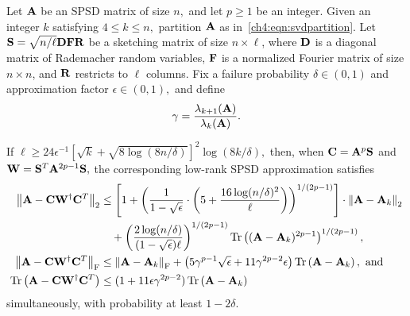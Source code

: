 \begin{thm}
Let $\mathbf{A}$ be an SPSD matrix of size $n,$ and let $p \geq 1$ be an integer. Given an integer $k$
satisfying $4 \leq k \leq n,$ partition $\mathbf{A}$ as in~\eqref{ch4:eqn:svdpartition}. Let 
$\mathbf{S} = \sqrt{n/\ell} \mathbf{D} \mathbf{F} \mathbf{R}$ be a sketching matrix of 
size $n \times \ell$, where $\mathbf{D}$ is a diagonal matrix of Rademacher 
random variables, $\mathbf{F}$ is a normalized Fourier matrix of size 
$n \times n$, and $\mathbf{R}$ restricts to $\ell$ columns. 
Fix a failure probability $\delta \in (0,1)$ and approximation factor $\epsilon \in (0,1),$ and define
\[
 \gamma = \frac{\lambda_{k+1}(\mathbf{A})}{\lambda_k(\mathbf{A})}.
\]


If $\ell \geq 24 \epsilon^{-1} [\sqrt{k} + \sqrt{8 \log( 8 n/\delta)}]^2 \log(8 k/\delta),$ 
then, when $\mathbf{C} = \mathbf{A}^p \mathbf{S}$ and 
$\mathbf{W} = \mathbf{S}^T \mathbf{A}^{2p-1} \mathbf{S},$ the corresponding low-rank SPSD 
approximation satisfies
\begin{equation}
 \begin{aligned}
  \left\|\mathbf{A} - \mathbf{C} \mathbf{W}^\dagger \mathbf{C}^T\right\|_2 & \leq  
  \left[ 1 + \left(\frac{1}{1 - \sqrt{\epsilon}} \cdot 
  \left(5 + \frac{16 \log(n/\delta)^2}{\ell}\right) \right)^{1/(2p-1)} \right] 
  \cdot
    \left\|\mathbf{A} - \mathbf{A}_k\right\|_2 \\
   & \quad +
     \left(\frac{2 \log(n/\delta)}{(1 - \sqrt{\epsilon})\ell} 
      \right)^{1/(2p-1)} 
     \operatorname{Tr}\left((\mathbf{A} - \mathbf{A}_k)^{2p-1}\right)^{1/(2p-1)}, \\
 \left\|\mathbf{A} - \mathbf{C} \mathbf{W}^\dagger \mathbf{C}^T\right\|_\mathrm{F} & \leq 
  \left\|\mathbf{A} - \mathbf{A}_k\right\|_\mathrm{F}
  + \left( 5 \gamma^{p-1} \sqrt{\epsilon} 
           + 11 \gamma^{2p-2} \epsilon \right) \operatorname{Tr}\left(\mathbf{A} - \mathbf{A}_k\right),
   \text{ and} \\
\label{eqn:relative2}
 \operatorname{Tr}\left(\mathbf{A} - \mathbf{C} \mathbf{W}^\dagger \mathbf{C}^T\right) & \leq 
 (1 + 11 \epsilon \gamma^{2p-2}) \operatorname{Tr}\left(\mathbf{A} - \mathbf{A}_k\right)
\end{aligned}
\end{equation}
simultaneously, with probability at least $1 - 2 \delta.$
\label{ch4:thm:proj-fourier}
\end{thm}

